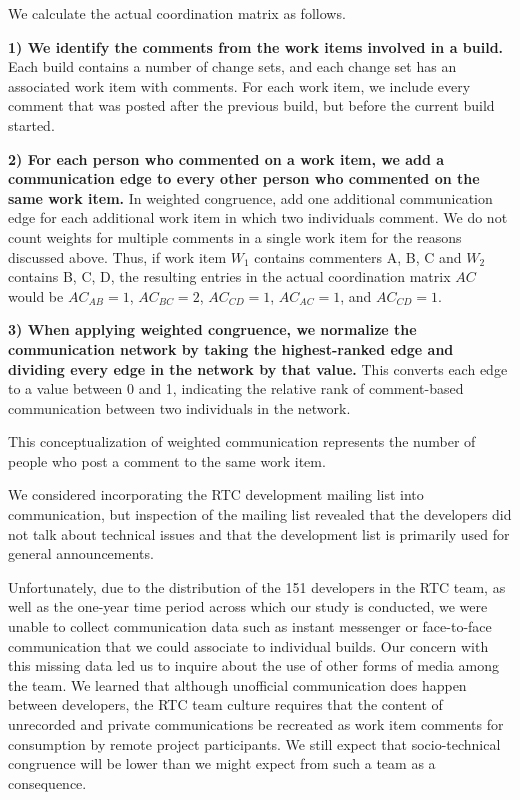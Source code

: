 We calculate the actual coordination matrix as follows.

\textbf{1) We identify the comments from the work items involved in a build.} Each build contains a number of change sets, and each change set has an associated work item with comments. For each work item, we include every comment that was posted after the previous build, but before the current build started.

\textbf{2) For each person who commented on a work item, we add a communication edge to every other person who commented on the same work item.} In weighted congruence, add one additional communication edge for each additional work item in which two individuals comment. We do not count weights for multiple comments in a single work item for the reasons discussed above. Thus, if work item $W_1$ contains commenters {A, B, C} and $W_2$ contains {B, C, D}, the resulting entries in the actual coordination matrix $AC$ would be $AC_{AB}=1$, $AC_{BC}=2$, $AC_{CD}=1$, $AC_{AC}=1$, and $AC_{CD}=1$.

\textbf{3) When applying weighted congruence, we normalize the communication network by taking the highest-ranked edge and dividing every edge in the network by that value.} This converts each edge to a value between 0 and 1, indicating the relative rank of comment-based communication between two individuals in the network.

This conceptualization of weighted communication represents the number of people who post a comment to the same work item.

We considered incorporating the RTC development mailing list into communication, but inspection of the mailing list revealed that the developers did not talk about technical issues and that the development list is primarily used for general announcements.

Unfortunately, due to the distribution of the 151 developers in the RTC team, as well as the one-year time period across which our study is conducted, we were unable to collect communication data such as instant messenger or face-to-face communication that we could associate to individual builds. Our concern with this missing data led us to inquire about the use of other forms of media among the team. We learned that although unofficial communication does happen between developers, the RTC team culture requires that the content of unrecorded and private communications be recreated as work item comments for consumption by remote project participants. We still expect that socio-technical congruence will be lower than we might expect from such a team as a consequence.

